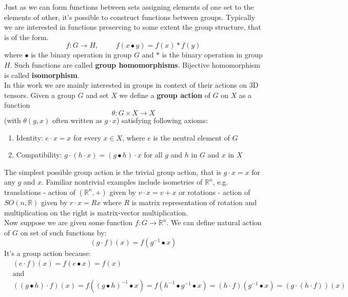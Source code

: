         Just as we can form functions between sets assigning elements of one set to
        the elements of other, it's possible to construct functions between groups.
        Typically we are interested in functions preserving to some extent the group structure,
        that is of the form.
        \begin{equation}
            f:G \to H, \hspace{1cm} f(x\bullet y) = f(x) \ast f(y)
        \end{equation}
        where $\bullet$ is the binary operation in group $G$ and $\ast$ is the binary operation
        in group $H$. Such functions are called \textbf{group homomorphisms}.
        Bijective homomorphism is called \textbf{isomorphism}.\\

        In this work we are mainly interested in groups in context of their actions
        on 3D tensors. Given a group $G$ and set $X$ we define a
        \textbf{group action} of $G$ on $X$ as a function
        \begin{equation}
            \theta: G \times X \to X
        \end{equation}
        (with $\theta(g,x)$ often written as $g\cdot x$) satisfying following axioms:
        \begin{enumerate}
            \item Identity: $e \cdot x = x$ for every $x \in X$, where $e$ is the neutral element
                    of $G$
            \item Compatibility: $g \cdot \left(h \cdot x\right) =
                \left(g \bullet h \right) \cdot x$ for all $g$ and $h$ in $G$ and $x$ in $X$
        \end{enumerate}
        The simplest possible group action is the trivial group action, that is
        $g\cdot x = x$ for any $g$ and $x$. Familiar nontrivial examples include isometries
        of $\mathbb{R}^n$, e.g.
        translations - action of $\left(\mathbb{R}^n,+\right)$ given by $v \cdot x = v+x$ or
        rotations - action of $SO(n,\mathbb{R})$ given by $r \cdot x = Rx$ where
        $R$ is matrix representation of rotation and
        multiplication on the right is matrix-vector multiplication.\\
        Now suppose we are given some function $f:G\to \mathbb{R}^n$.
        We can define natural action of $G$ on set of such functions by:
        \begin{equation}
            (g\cdot f)(x) = f(g^{-1}\bullet x)
            \label{eq:action_on_function}
        \end{equation}
        It's a group action because:
        \begin{align*}
            & (e\cdot f)(x) = f(e\bullet x) = f(x) \\
            & \mbox{and} \\
            & ((g\bullet h) \cdot f)(x) = f((g\bullet h)^{-1} \bullet x) =
            f(h^{-1}\bullet g^{-1} \bullet x) = (h\cdot f)(g^{-1} \bullet x) =
            (g\cdot(h \cdot f))(x)
        \end{align*}








